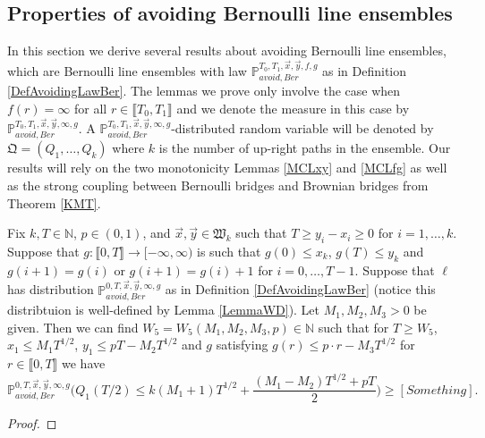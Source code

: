 \subsection{Properties of avoiding Bernoulli line ensembles}\label{Section3.3}  In this section we derive several results about avoiding Bernoulli line ensembles, which are Bernoulli line ensembles with law $\mathbb{P}_{avoid, Ber}^{T_0,T_1, \vec{x}, \vec{y}, f, g}$ as in Definition \ref{DefAvoidingLawBer}. The lemmas we prove only involve the case when $f(r) = \infty$ for all $r \in \llbracket T_0, T_1 \rrbracket$ and we denote the measure in this case by $\mathbb{P}_{avoid, Ber}^{T_0,T_1, \vec{x}, \vec{y}, \infty, g}$. A $\mathbb{P}_{avoid, Ber}^{T_0,T_1, \vec{x}, \vec{y}, \infty, g}$-distributed random variable will be denoted by $\mathfrak{Q} = (Q_1, \dots, Q_k)$ where $k$ is the number of up-right paths in the ensemble. Our results will rely on the two monotonicity Lemmas \ref{MCLxy} and \ref{MCLfg} as well as the strong coupling between Bernoulli bridges and Brownian bridges from Theorem \ref{KMT}.


\begin{lemma}\label{LemmaDip}Fix $k, T \in \mathbb{N}$, $p \in (0,1)$, and $\vec{x}, \vec{y} \in \mathfrak{W}_k$ such that $T \geq y_i-x_i \geq 0$ for $i = 1, \dots, k$. Suppose that $g: \llbracket 0, T \rrbracket \rightarrow [-\infty, \infty)$ is such that $g(0) \leq x_k$, $g(T) \leq y_k$ and $g(i +1 ) = g(i) $ or $g(i+1) = g(i) +1$ for $i = 0, \dots, T-1$. Suppose that $\ell$ has distribution $\mathbb{P}^{0,T,\vec{x},\vec{y}, \infty ,g}_{avoid,Ber}$ as in Definition \ref{DefAvoidingLawBer} (notice this distribtuion is well-defined by Lemma \ref{LemmaWD}). Let $M_1,M_2, M_3 > 0$ be given. Then we can find $W_5 = W_5(M_1,M_2, M_3, p) \in \mathbb{N}$ such that for $T \geq W_5$, $ x_1 \leq M_1T^{1/2}$, $ y_1 \leq pT -  M_2 T^{1/2}$ and $g$ satisfying $g(r) \leq p \cdot r - M_3T^{1/2}$ for $r \in \llbracket 0, T\rrbracket$ we have
\begin{equation}\label{eqDip}
\mathbb{P}^{0,T,\vec{x},\vec{y}, \infty ,g}_{avoid,Ber}\bigg( Q_1( T/2 )  \leq k (M_1+1)T^{1/2} +  \frac{ (M_1 - M_2)T^{1/2} + p T}{2}  \bigg) \geq [Something].
\end{equation}
\end{lemma}
\begin{proof}
\end{proof}
